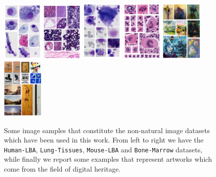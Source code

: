 \begin{figure}
  \centering
   \includegraphics[width=2cm,height=\textheight,keepaspectratio]{./Images/Chapter05/lba.pdf}%
  \includegraphics[width=2cm,height=\textheight,keepaspectratio]{./Images/Chapter05/tissus.pdf}%
  \includegraphics[width=2cm,height=\textheight,keepaspectratio]{./Images/Chapter05/mouse_lba.pdf}%
    \includegraphics[width=2cm,height=\textheight,keepaspectratio]{./Images/Chapter05/bonemarrow.pdf}%
  \includegraphics[width=2cm,height=\textheight,keepaspectratio]{./Images/Chapter05/artist.pdf}%
  \includegraphics[width=2cm,height=\textheight,keepaspectratio]{./Images/Chapter05/type.pdf}%
\caption{Some image samples that constitute the non-natural image datasets which have been used in this work.
From left to right we have the \texttt{Human-LBA}, \texttt{Lung-Tissues}, \texttt{Mouse-LBA} and \texttt{Bone-Marrow} datasets, while finally we report some examples that represent artworks which come from the field of digital heritage.}
\label{fig:dataset_images}
\end{figure}

